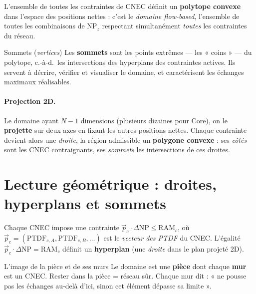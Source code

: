 \documentclass[11pt,a4paper]{article}
\newcommand{\NP}{\mathrm{NP}}
\newcommand{\PTDF}{\mathrm{PTDF}}
\begin{document}
L'ensemble de toutes les contraintes de CNEC définit un \textbf{polytope
convexe} dans l'espace des positions nettes : c'est le \emph{domaine
flow-based}, l'ensemble de toutes les combinaisons de $\NP_z$ respectant
simultanément \emph{toutes} les contraintes du réseau.

\begin{defbox}{Sommets (\textit{vertices})}
Les \textbf{sommets} sont les points extrêmes — les « coins » — du polytope,
c.-à-d.\ les intersections des hyperplans des contraintes actives. Ils
servent à décrire, vérifier et visualiser le domaine, et caractérisent les
échanges maximaux réalisables.
\end{defbox}

\paragraph{Projection 2D.} Le domaine ayant $N-1$ dimensions (plusieurs
dizaines pour Core), on le \textbf{projette} sur deux axes en fixant les
autres positions nettes. Chaque contrainte devient alors une \emph{droite},
la région admissible un \textbf{polygone convexe} : ses \emph{côtés} sont
les CNEC contraignants, ses \emph{sommets} les intersections de ces droites.

\section{Lecture géométrique : droites, hyperplans et sommets}
\label{sec:geometrie}

Chaque CNEC impose une contrainte
$\vec{p}_c \cdot \Delta\mathrm{NP} \le \mathrm{RAM}_c$, où
$\vec{p}_c=(\PTDF_{c,A},\PTDF_{c,B},\dots)$ est le \emph{vecteur des PTDF}
du CNEC. L'égalité $\vec{p}_c\cdot\Delta\mathrm{NP}=\mathrm{RAM}_c$ définit
un \textbf{hyperplan} (une \emph{droite} dans le plan projeté 2D).

\begin{defbox}{L'image de la pièce et de ses murs}
Le domaine est une \textbf{pièce} dont chaque \textbf{mur} est un CNEC.
Rester dans la pièce = réseau sûr. Chaque mur dit : « ne pousse pas les
échanges au-delà d'ici, sinon cet élément dépasse sa limite ».
\end{defbox}
\end{document}
